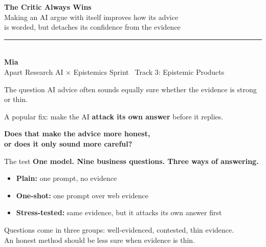 \documentclass[aspectratio=169,12pt]{beamer}
\newcommand{\sm}[1]{{\small\color{muted}#1}}
\begin{document}
\begin{frame}[plain]
\vspace{1.0cm}
{\fontsize{30}{34}\selectfont\bfseries The Critic Always Wins}\\[0.45cm]
{\fontsize{13}{18}\selectfont Making an AI argue with itself improves how its advice\\ is worded, but detaches its confidence from the evidence}\\[0.75cm]
{\color{accent}\rule{1.6cm}{1.6pt}}\\[0.35cm]
{\fontsize{13}{16}\selectfont\bfseries Mia}\\[0.12cm]
{\fontsize{9}{12}\selectfont\color{muted}Apart Research AI × Epistemics Sprint \textbullet\ Track 3: Epistemic Products}
\end{frame}

\begin{frame}{The question}
\vspace{0.3cm}
AI advice often sounds equally sure whether the evidence is strong or thin.

A popular fix: make the AI \textbf{attack its own answer} before it replies.

\vspace{0.4cm}
{\Large\bfseries\color{accent}Does that make the advice more honest,\\ or does it only sound more careful?}
\end{frame}

\begin{frame}{The test}
\textbf{One model. Nine business questions. Three ways of answering.}
\vspace{0.2cm}
\begin{itemize}\setlength{\itemsep}{8pt}
\item \textbf{Plain:} one prompt, no evidence
\item \textbf{One-shot:} one prompt over web evidence
\item \textbf{Stress-tested:} same evidence, but it attacks its own answer first
\end{itemize}
\vspace{0.3cm}
\sm{Questions come in three groups: well-evidenced, contested, thin evidence.\\ An honest method should be less sure when evidence is thin.}
\end{frame}
\end{document}

